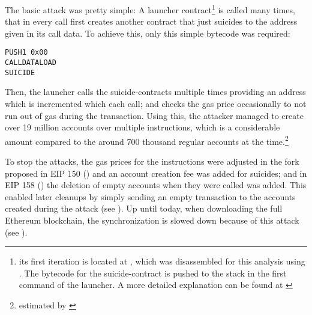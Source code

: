 The basic attack was pretty simple: A launcher contract\footnote{its first iteration is located at \cite{etherscan:ddoslauncher}, which was disassembled for this analysis using \cite{consensys:mythril}. The bytecode for the suicide-contract is pushed to the stack in the first command of the launcher. A more detailed explanation can be found at \cite{stackexchange:dosexplained}} is called many times, that in every call first creates another contract that just suicides to the address given in its call data. To achieve this, only this simple bytecode was required:
\begin{verbatim}
PUSH1 0x00
CALLDATALOAD
SUICIDE
\end{verbatim}

Then, the launcher calls the suicide-contracts multiple times providing an address which is incremented which each call; and checks the gas price occasionally to not run out of gas during the transaction. Using this, the attacker managed to create over 19 million accounts over multiple instructions, which is a considerable amount compared to the around 700 thousand regular accounts at the time.\footnote{estimated by \cite{bokconsulting:dos}}

To stop the attacks, the gas prices for the instructions were adjusted in the fork proposed in EIP 150 (\cite{ethereum:eip150}) and an account creation fee was added for suicides; and in EIP 158 (\cite{ethereum:eip158}) the deletion of empty accounts when they were called was added. This enabled later cleanups by simply sending an empty transaction to the accounts created during the attack (see \cite{etherscan:sweeper}). Up until today, when downloading the full Ethereum blockchain, the synchronization is slowed down because of this attack (see \cite{ethereum:slowsyncing}).